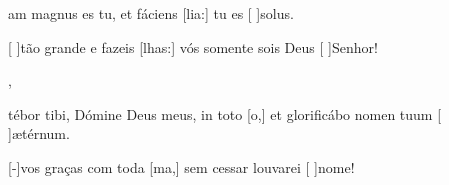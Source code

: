 {  {\item {}am magnus es tu, et fáciens [lia:] tu es [ ]{so}lus.~\Antiphona}%
    {\item {}[ ]{tão} grande e fazeis [lhas:] vós somente sois Deus [ ]{Se}{nhor}!~\Antiphona},
  {\item {}tébor tibi, Dómine Deus meus, in toto [o,] et glorificábo nomen tuum [ ]{æ}{tér}num.~\Antiphona}%
    {\item {}[-]{vos} graças com toda [ma,] sem cessar louvarei [ ]{no}me!~\Antiphona}
}